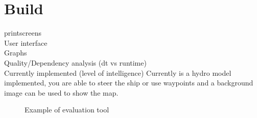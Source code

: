 \section{Build}
printscreens\\
User interface\\
Graphs\\
Quality/Dependency analysis (dt vs runtime)\\
Currently implemented (level of intelligence)
Currently is a hydro model implemented, you are able to steer the ship or use waypoints and a background image can be used to show the map.

\begin{figure}[hb]
	\centering
	\caption{Example of evaluation tool}
	\label{fig:printscreen-tool}
\end{figure}